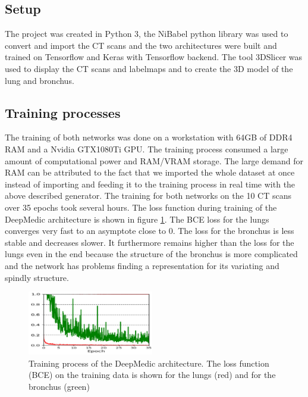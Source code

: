 
\subsection{Setup}

The project was created in Python 3, the NiBabel python library was used to convert and import the CT scans and the two architectures were built and trained on Tensorflow and Keras with Tensorflow backend. The tool 3DSlicer was used to display the CT scans and labelmaps and to create the 3D model of the lung and bronchus.

\subsection{Training processes}
The training of both networks was done on a workstation with 64GB of DDR4 RAM and a Nvidia GTX1080Ti GPU. The training process consumed a large amount of computational power and RAM/VRAM storage. The large demand for RAM can be attributed to the fact that we imported the whole dataset at once instead of importing and feeding it to the training process in real time with the above described generator. The training for both networks on the 10 CT scans over 35 epochs took several hours.\newline 
The loss function during training of the DeepMedic architecture is shown in figure \ref{train_deepmedic}. The BCE loss for the lungs converges very fast to an asymptote close to 0. The loss for the bronchus is less stable and decreases slower. It furthermore remains higher than the loss for the lungs even in the end because the structure of the bronchus is more complicated and the network has problems finding a representation for its variating and spindly structure.\newline
\begin{figure}[h!]
	\includegraphics[width=0.49\textwidth, angle=0]{files/deepmedictrain.png}
	\caption{Training process of the DeepMedic architecture. The loss function (BCE) on the training data is shown for the lungs (red) and for the bronchus (green)}
	\label{train_deepmedic}
\end{figure}

